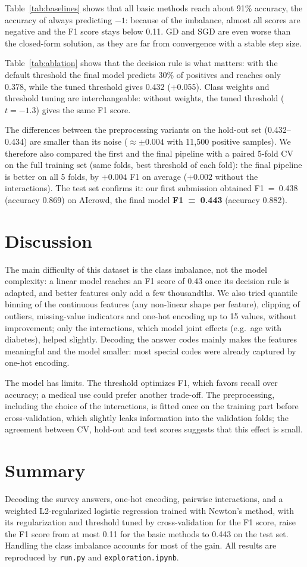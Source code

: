\documentclass[10pt,conference,compsocconf]{IEEEtran}
\begin{document}
Table~\ref{tab:baselines} shows that all basic methods reach about 91\%
accuracy, the accuracy of always predicting $-1$: because of the
imbalance, almost all scores are negative and the F1 score stays below
0.11. GD and SGD are even worse than the closed-form solution, as they are
far from convergence with a stable step size.

Table~\ref{tab:ablation} shows that the decision rule is what matters:
with the default threshold the final model predicts 30\% of positives and
reaches only 0.378, while the tuned threshold gives 0.432 (+0.055).
Class weights and threshold tuning are interchangeable: without weights,
the tuned threshold ($t=-1.3$) gives the same F1 score.

The differences between the preprocessing variants on the hold-out set
(0.432--0.434) are smaller than its noise ($\approx\pm0.004$ with 11{,}500
positive samples). We therefore also compared the first and the final
pipeline with a paired 5-fold CV on the full training set (same folds, best
threshold of each fold): the final pipeline is better on all 5 folds, by
$+0.004$ F1 on average ($+0.002$ without the interactions). The test set
confirms it: our first submission obtained F1~=~0.438 (accuracy 0.869) on
AIcrowd, the final model \textbf{F1~=~0.443} (accuracy 0.882).

\section{Discussion}
The main difficulty of this dataset is the class imbalance, not the model
complexity: a linear model reaches an F1 score of 0.43 once its decision
rule is adapted, and better features only add a few thousandths. We also
tried quantile binning of the continuous features (any non-linear shape
per feature), clipping of outliers, missing-value indicators and one-hot
encoding up to 15 values, without improvement; only the interactions,
which model joint effects (e.g.\ age with diabetes), helped slightly.
Decoding the answer codes mainly makes the features meaningful and the
model smaller: most special codes were already captured by one-hot
encoding.

The model has limits. The threshold optimizes F1, which favors recall
over accuracy; a medical use could prefer another trade-off. The
preprocessing, including the choice of the interactions, is fitted once on
the training part before cross-validation, which slightly leaks
information into the validation folds; the agreement between CV, hold-out
and test scores suggests that this effect is small.

\section{Summary}
Decoding the survey answers, one-hot encoding, pairwise interactions, and
a weighted L2-regularized logistic regression trained with Newton's
method, with its regularization and threshold tuned by cross-validation
for the F1 score, raise the F1 score from at most 0.11 for the basic
methods to 0.443 on the test set. Handling the class imbalance accounts
for most of the gain. All results are reproduced by \texttt{run.py} and
\texttt{exploration.ipynb}.
\end{document}
